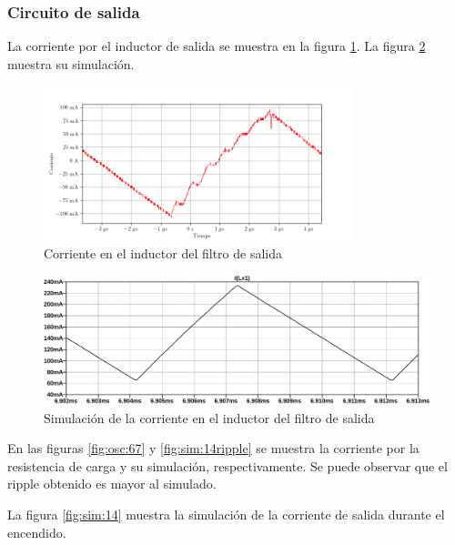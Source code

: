 \subsubsection{Circuito de salida}

La corriente por el inductor de salida se muestra en la figura \ref{fig:osc:66}. La figura \ref{fig:sim:13} muestra su simulación.

\begin{figure}[H]
    \centering
    \includegraphics[width=0.8\textwidth]{images/capturas-osciloscopio/17-11-2022/66.png}
    \caption{Corriente en el inductor del filtro de salida}
    \label{fig:osc:66}
\end{figure}

\begin{figure}[H]
    \centering
    \includegraphics[width=\textwidth]{images/sim/13.pdf}
    \caption{Simulación de la corriente en el inductor del filtro de salida}
    \label{fig:sim:13}
\end{figure}

En las figuras \ref{fig:osc:67} y \ref{fig:sim:14ripple} se muestra la corriente por la resistencia de carga y su simulación, respectivamente. Se puede observar que el ripple obtenido es mayor al simulado.

La figura \ref{fig:sim:14} muestra la simulación de la corriente de salida durante el encendido.



